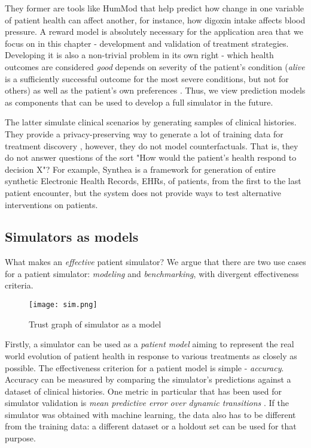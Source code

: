 They former are tools like HumMod \cite{hummod} that help predict how change in one variable of patient health can affect another, for instance, how digoxin intake affects blood pressure.
A reward model is absolutely necessary for the application area that we focus on in this chapter - development and validation of treatment strategies.
Developing it is also a non-trivial problem in its own right - which health outcomes are considered \emph{good} depends on severity of the patient's condition (\emph{alive} is a sufficiently successful outcome for the most severe conditions, but not for others) as well as the patient's own preferences \cite{patpreferences1,patpreferences2}.
Thus, we view prediction models as components that can be used to develop a full simulator in the future.

The latter simulate clinical scenarios by generating samples of clinical histories.
They provide a privacy-preserving way to generate a lot of training data for treatment discovery \cite{privacy1,privacy2,privacy3,privacy4}, however, they do not model counterfactuals. That is, they do not answer questions of the sort "How would the patient's health respond to decision X"? For example, Synthea \cite{synthea} is a framework for generation of entire synthetic Electronic Health Records, EHRs, of patients, from the first to the last patient encounter, but the system does not provide ways to test alternative interventions on patients. 

\subsection{Simulators as models}

What makes an \emph{effective} patient simulator? 
We argue that there are two use cases for a patient simulator: {\sl modeling} and {\sl benchmarking}, with divergent effectiveness criteria.

\begin{figure}
    \centering
    \texttt{[image: sim.png]}
    \caption{Trust graph of simulator as a model}
    \label{fig:model}
\end{figure}

Firstly, a simulator can be used as a \emph{patient model} aiming to represent the real world evolution of patient health in response to various treatments as closely as possible.
The effectiveness criterion for a patient model is simple - \emph{accuracy}.
Accuracy can be measured by comparing the simulator's predictions against a dataset of clinical histories.
One metric in particular that has been used for simulator validation is \emph{mean predictive error over dynamic transitions} \cite{mdpe}.
If the simulator was obtained with machine learning, the data also has to be different from the training data: a different dataset or a holdout set can be used for that purpose.

